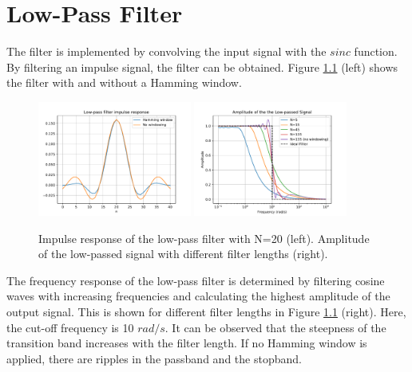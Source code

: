 \documentclass[12pt, a4paper]{report}
\begin{document}
\chapter{Low-Pass Filter}

The filter is implemented by convolving the input signal with the \(sinc\) function.
By filtering an impulse signal, the filter can be obtained.
Figure \ref{fig:low_pass_filter} (left) shows the filter with and without a Hamming window.

\begin{figure}[h!]
	\centering
	\includegraphics[width=0.45\textwidth]{figures/impulse_response.pdf}
	\includegraphics[width=0.45\textwidth]{figures/passband.pdf}
	\caption{Impulse response of the low-pass filter with N=20 (left). Amplitude of the low-passed signal with different filter lengths (right).}
	\label{fig:low_pass_filter}
\end{figure}

The frequency response of the low-pass filter is determined by filtering cosine waves with increasing frequencies
and calculating the highest amplitude of the output signal.
This is shown for different filter lengths in Figure \ref{fig:low_pass_filter} (right).
Here, the cut-off frequency is 10 \({rad}/s\).
It can be observed that the steepness of the transition band increases with the filter length.
If no Hamming window is applied, there are ripples in the passband and the stopband.
\end{document}
